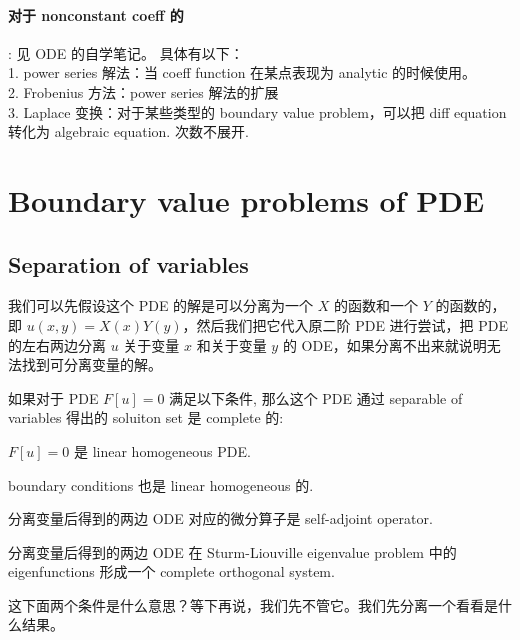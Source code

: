 \documentclass[12pt]{article}
\begin{document}
\paragraph{对于 nonconstant coeff 的}: 
见 ODE 的自学笔记。
具体有以下：\\
1. power series 解法：当 coeff function 在某点表现为 analytic 的时候使用。
\\2. Frobenius 方法：power series 解法的扩展
\\3. Laplace 变换：对于某些类型的 boundary value problem，可以把 diff equation 转化为 algebraic equation.
次数不展开.

\section{Boundary value problems of PDE}
\subsection{Separation of variables}
我们可以先假设这个 PDE 的解是可以分离为一个 $X$ 的函数和一个 $Y$ 的函数的，即 $u(x,y) = X(x)Y(y)$，然后我们把它代入原二阶 PDE 进行尝试，把 PDE 的左右两边分离 $u$ 关于变量 $x$ 和关于变量 $y$ 的 ODE，如果分离不出来就说明无法找到可分离变量的解。
\\

\begin{theorem}
    如果对于 PDE $F[u] = 0$ 满足以下条件, 那么这个 PDE 通过 separable of variables 得出的 soluiton set 是 complete 的:\\
    \begin{compactenumI}
    \item $F[u] = 0$ 是 linear homogeneous PDE.
    \item boundary conditions 也是 linear homogeneous 的.
    \item 分离变量后得到的两边 ODE 对应的微分算子是 self-adjoint operator.
    \item 分离变量后得到的两边 ODE 在 Sturm-Liouville eigenvalue problem 中的 eigenfunctions 形成一个 complete orthogonal system.
\end{compactenumI}
\end{theorem}
这下面两个条件是什么意思？等下再说，我们先不管它。我们先分离一个看看是什么结果。
\end{document}
